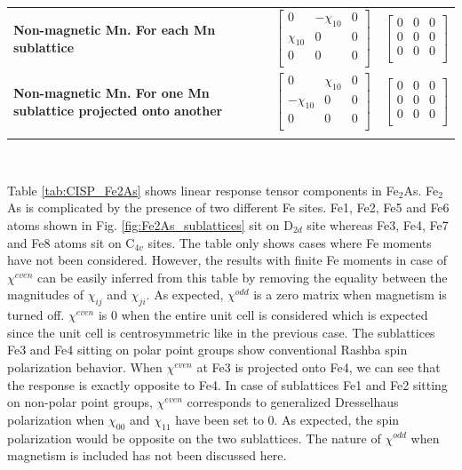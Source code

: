 \documentclass[10pt,doublespacing,edeposit]{uiucthesis2020}
\begin{document}
\begin{mainmatter}
\begin{table}
\begin{tabular}{>{\raggedright\arraybackslash}p{7cm}>{\centering\arraybackslash}p{3.5cm}>{\centering\arraybackslash}p{3.5cm}}
\addlinespace[1.5ex]
\hline
\addlinespace[1.5ex]
\textbf{Non-magnetic Mn. For each Mn sublattice} & $\begin{bmatrix} 0 & -\chi_{10} & 0\\ \chi_{10} & 0 & 0\\  0 & 0 & 0\\ \end{bmatrix}$ & $\begin{bmatrix} 0 & 0 & 0\\ 0 & 0 & 0\\ 0 & 0 & 0\\ \end{bmatrix}$\\
\addlinespace[1.5ex]
\hline
\addlinespace[1.5ex]
\textbf{Non-magnetic Mn. For one Mn sublattice projected onto another} & $\begin{bmatrix} 0 & \chi_{10} & 0\\ -\chi_{10} & 0 & 0\\  0 & 0 & 0\\ \end{bmatrix}$ & $\begin{bmatrix} 0 & 0 & 0\\ 0 & 0 & 0\\ 0 & 0 & 0\\ \end{bmatrix}$\\
\addlinespace[1.5ex]
\hline\hline
\end{tabular}
~\\
\end{table}

Table \ref{tab:CISP_Fe2As} shows linear response tensor components in Fe$_2$As. Fe$_2$As is complicated by the presence of two different Fe sites. Fe1, Fe2, Fe5 and Fe6 atoms shown in Fig. \ref{fig:Fe2As_sublattices} sit on D$_{2d}$ site whereas Fe3, Fe4, Fe7 and Fe8 atoms sit on C$_{4v}$ sites. The table only shows cases where Fe moments have not been considered. However, the results with finite Fe moments in case of $\chi^{even}$ can be easily inferred from this table by removing the equality between the magnitudes of $\chi_{ij}$ and $\chi_{ji}$. As expected, $\chi^{odd}$ is a zero matrix when magnetism is turned off. $\chi^{even}$ is 0 when the entire unit cell is considered which is expected since the unit cell is centrosymmetric like in the previous case. The sublattices Fe3 and Fe4 sitting on polar point groups show conventional Rashba spin polarization behavior. When $\chi^{even}$ at Fe3 is projected onto Fe4, we can see that the response is exactly opposite to Fe4. In case of sublattices Fe1 and Fe2 sitting on non-polar point groups, $\chi^{even}$ corresponds to generalized Dresselhaus polarization when $\chi_{00}$ and $\chi_{11}$ have been set to 0. As expected, the spin polarization would be opposite on the two sublattices. The nature of $\chi^{odd}$ when magnetism is included has not been discussed here.




\end{mainmatter}
\end{document}
